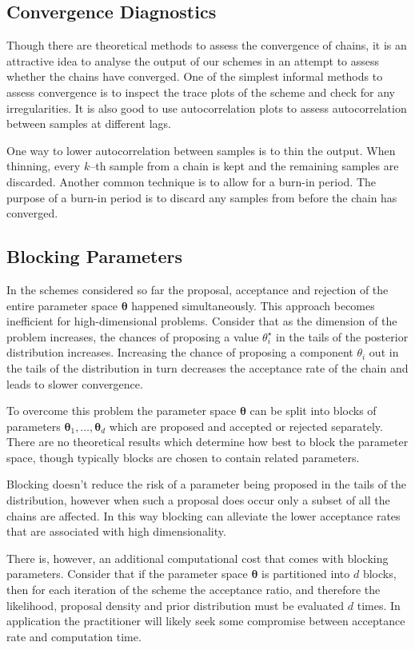 \subsection{Convergence Diagnostics}
\label{ssec:convergence_diagnostics}
Though there are theoretical methods to assess the convergence of chains, it is an attractive idea to analyse the output of our schemes in an attempt to assess whether the chains have converged. One of the simplest informal methods to assess convergence is to inspect the trace plots of the scheme and check for any irregularities. It is also good to use autocorrelation plots to assess autocorrelation between samples at different lags.

One way to lower autocorrelation between samples is to thin the output. When thinning, every $k$--th sample from a chain is kept and the remaining samples are discarded. Another common technique is to allow for a burn-in period. The purpose of a burn-in period is to discard any samples from before the chain has converged.

\subsection{Blocking Parameters}
\label{ssec:blocking}
In the schemes considered so far the proposal, acceptance and rejection of the entire parameter space $\bm{\theta}$ happened simultaneously. This approach becomes inefficient for high-dimensional problems. Consider that as the dimension of the problem increases, the chances of proposing a value $\theta_i^\star$ in the tails of the posterior distribution increases. Increasing the chance of proposing a component $\theta_i$ out in the tails of the distribution in turn decreases the acceptance rate of the chain and leads to slower convergence.

To overcome this problem the parameter space $\bm{\theta}$ can be split into blocks of parameters $\bm{\theta}_1, \ldots, \bm{\theta}_d$ which are proposed and accepted or rejected separately. There are no theoretical results which determine how best to block the parameter space, though typically blocks are chosen to contain related parameters.

Blocking doesn't reduce the risk of a parameter being proposed in the tails of the distribution, however when such a proposal does occur only a subset of all the chains are affected. In this way blocking can alleviate the lower acceptance rates that are associated with high dimensionality.

There is, however, an additional computational cost that comes with blocking parameters. Consider that if the parameter space $\bm{\theta}$ is partitioned into $d$ blocks, then for each iteration of the scheme the acceptance ratio, and therefore the likelihood, proposal density and prior distribution must be evaluated $d$ times. In application the practitioner will likely seek some compromise between acceptance rate and computation time.